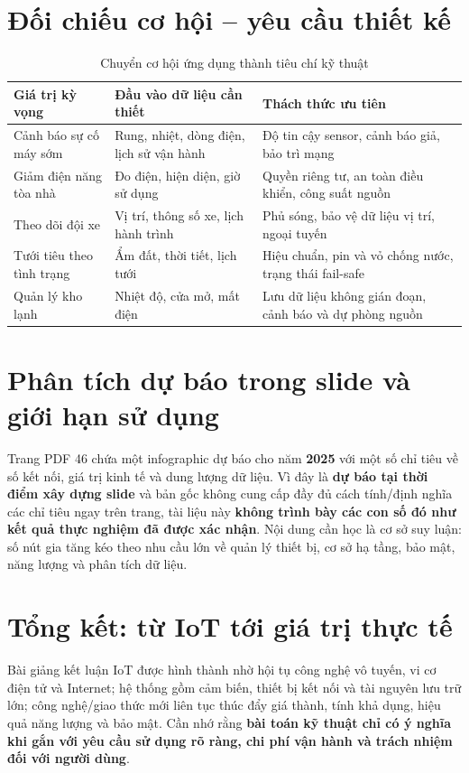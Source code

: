 \section{Đối chiếu cơ hội -- yêu cầu thiết kế}
\begin{table}[H]\centering\small
\caption{Chuyển cơ hội ứng dụng thành tiêu chí kỹ thuật}
\begin{tabularx}{\textwidth}{p{3cm}XX}\toprule
Giá trị kỳ vọng&Đầu vào dữ liệu cần thiết&Thách thức ưu tiên\\\midrule
Cảnh báo sự cố máy sớm&Rung, nhiệt, dòng điện, lịch sử vận hành&Độ tin cậy sensor, cảnh báo giả, bảo trì mạng\\
Giảm điện năng tòa nhà&Đo điện, hiện diện, giờ sử dụng&Quyền riêng tư, an toàn điều khiển, công suất nguồn\\
Theo dõi đội xe&Vị trí, thông số xe, lịch hành trình&Phủ sóng, bảo vệ dữ liệu vị trí, ngoại tuyến\\
Tưới tiêu theo tình trạng&Ẩm đất, thời tiết, lịch tưới&Hiệu chuẩn, pin và vỏ chống nước, trạng thái fail-safe\\
Quản lý kho lạnh&Nhiệt độ, cửa mở, mất điện&Lưu dữ liệu không gián đoạn, cảnh báo và dự phòng nguồn\\\bottomrule
\end{tabularx}
\end{table}

\section{Phân tích dự báo trong slide và giới hạn sử dụng}
Trang PDF 46 chứa một infographic dự báo cho năm \textbf{2025} với một số chỉ tiêu về số kết nối, giá trị kinh tế và dung lượng dữ liệu. Vì đây là \textbf{dự báo tại thời điểm xây dựng slide} và bản gốc không cung cấp đầy đủ cách tính/định nghĩa các chỉ tiêu ngay trên trang, tài liệu này \textbf{không trình bày các con số đó như kết quả thực nghiệm đã được xác nhận}. Nội dung cần học là cơ sở suy luận: số nút gia tăng kéo theo nhu cầu lớn về quản lý thiết bị, cơ sở hạ tầng, bảo mật, năng lượng và phân tích dữ liệu.

\section{Tổng kết: từ IoT tới giá trị thực tế}
Bài giảng kết luận IoT được hình thành nhờ hội tụ công nghệ vô tuyến, vi cơ điện tử và Internet; hệ thống gồm cảm biến, thiết bị kết nối và tài nguyên lưu trữ lớn; công nghệ/giao thức mới liên tục thúc đẩy giá thành, tính khả dụng, hiệu quả năng lượng và bảo mật. Cần nhớ rằng \textbf{bài toán kỹ thuật chỉ có ý nghĩa khi gắn với yêu cầu sử dụng rõ ràng, chi phí vận hành và trách nhiệm đối với người dùng}.


